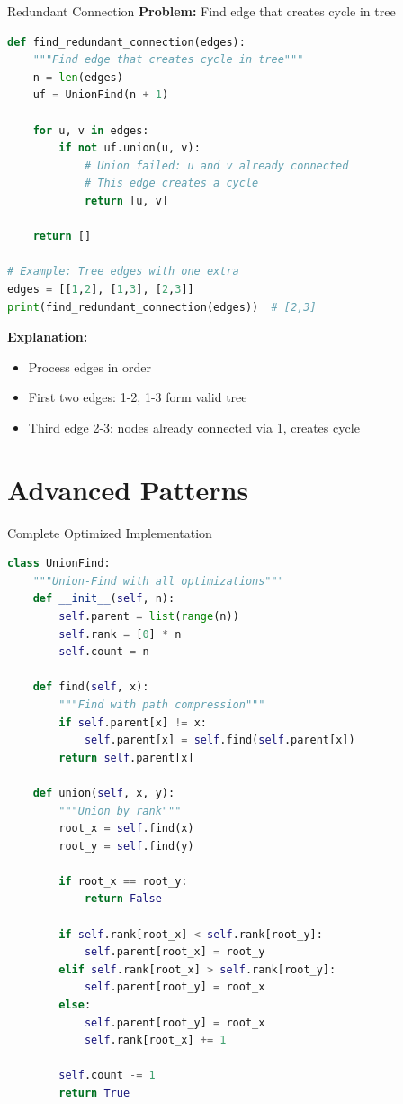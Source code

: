 \documentclass[aspectratio=169]{beamer}
\begin{document}
\begin{frame}[fragile]{Redundant Connection}
  \textbf{Problem:} Find edge that creates cycle in tree

  \begin{lstlisting}[language=Python, basicstyle=\ttfamily\footnotesize]
def find_redundant_connection(edges):
    """Find edge that creates cycle in tree"""
    n = len(edges)
    uf = UnionFind(n + 1)

    for u, v in edges:
        if not uf.union(u, v):
            # Union failed: u and v already connected
            # This edge creates a cycle
            return [u, v]

    return []

# Example: Tree edges with one extra
edges = [[1,2], [1,3], [2,3]]
print(find_redundant_connection(edges))  # [2,3]
  \end{lstlisting}

  \vspace{0.3cm}
  \textbf{Explanation:}
  \begin{itemize}
    \item Process edges in order
    \item First two edges: 1-2, 1-3 form valid tree
    \item Third edge 2-3: nodes already connected via 1, creates cycle
  \end{itemize}
\end{frame}

\section{Advanced Patterns}

\begin{frame}[fragile]{Complete Optimized Implementation}
  \begin{lstlisting}[language=Python, basicstyle=\ttfamily\footnotesize]
class UnionFind:
    """Union-Find with all optimizations"""
    def __init__(self, n):
        self.parent = list(range(n))
        self.rank = [0] * n
        self.count = n

    def find(self, x):
        """Find with path compression"""
        if self.parent[x] != x:
            self.parent[x] = self.find(self.parent[x])
        return self.parent[x]

    def union(self, x, y):
        """Union by rank"""
        root_x = self.find(x)
        root_y = self.find(y)

        if root_x == root_y:
            return False

        if self.rank[root_x] < self.rank[root_y]:
            self.parent[root_x] = root_y
        elif self.rank[root_x] > self.rank[root_y]:
            self.parent[root_y] = root_x
        else:
            self.parent[root_y] = root_x
            self.rank[root_x] += 1

        self.count -= 1
        return True
  \end{lstlisting}
\end{frame}
\end{document}
